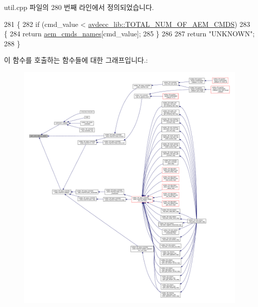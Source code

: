 util.\+cpp 파일의 280 번째 라인에서 정의되었습니다.


\begin{DoxyCode}
281     \{
282         \textcolor{keywordflow}{if} (cmd\_value < \hyperlink{namespaceavdecc__lib_a1631d53b37995d16b597a5e1a78c55a5a2652011764b6cd6e327a6bcbbccb422b}{avdecc\_lib::TOTAL\_NUM\_OF\_AEM\_CMDS})
283         \{
284             \textcolor{keywordflow}{return} \hyperlink{namespaceavdecc__lib_1_1utility_af0c1057de627c1dae00680009dc11782}{aem\_cmds\_names}[cmd\_value];
285         \}
286 
287         \textcolor{keywordflow}{return} \textcolor{stringliteral}{"UNKNOWN"};
288     \}
\end{DoxyCode}


이 함수를 호출하는 함수들에 대한 그래프입니다.\+:
\nopagebreak
\begin{figure}[H]
\begin{center}
\leavevmode
\includegraphics[width=350pt]{namespaceavdecc__lib_1_1utility_a4c304db966bad783728a6a9e0aefed18_icgraph}
\end{center}
\end{figure}


